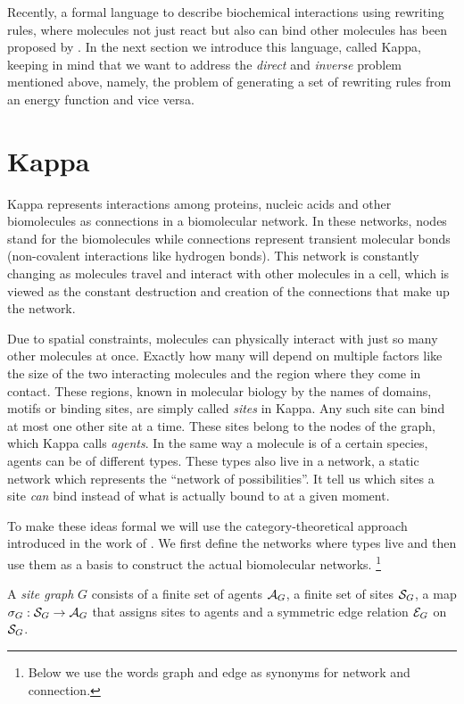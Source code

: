 Recently,
a formal language to describe biochemical interactions
using rewriting rules,
where molecules not just react but also can bind other molecules
has been proposed by \citet{kappa}.
In the next section we introduce this language, called Kappa,
keeping in mind that we want to address
the \emph{direct} and \emph{inverse} problem mentioned above,
namely, the problem of generating a set of rewriting rules
from an energy function and vice versa.


\section{Kappa}
\label{sec:kappa}

Kappa represents interactions among proteins,
nucleic acids and other biomolecules as
connections in a biomolecular network.
In these networks, nodes stand for the biomolecules
while connections represent transient molecular bonds
(\eg non-covalent interactions like hydrogen bonds).
This network is constantly changing as molecules
travel and interact with other molecules in a cell,
which is viewed as the constant destruction and creation
of the connections that make up the network.

Due to spatial constraints,
molecules can physically interact with
just so many other molecules at once.
Exactly how many will depend on multiple factors like
the size of the two interacting molecules and
the region where they come in contact.
These regions, known in molecular biology by the names of domains,
motifs or binding sites, are simply called \emph{sites} in Kappa.
Any such site can bind at most one other site at a time.
These sites belong to the nodes of the graph,
which Kappa calls \emph{agents}.
In the same way a molecule is of a certain species,
agents can be of different types.
These types also live in a network,
a static network which represents the ``network of possibilities''.
It tell us which sites a site \emph{can} bind
instead of what is actually bound to at a given moment.

To make these ideas formal we will use
the category-theoretical approach %
introduced in the work of \citet{kappadpo}.
We first define the networks where types live and then
use them as a basis to construct the actual biomolecular networks.%
\footnote{
  Below we use the words graph and edge
  as synonyms for network and connection.}

\begin{definition}%
  A \emph{site graph} $G$ consists of
  a finite set of agents $\mathcal{A}_G$,
  a finite set of sites $\mathcal{S}_G$,
  a map $\sigma_G: \mathcal{S}_G \to \mathcal{A}_G$
  that assigns sites to agents
  and a symmetric edge relation $\mathcal{E}_G$ on $\mathcal{S}_G$.
\end{definition}

